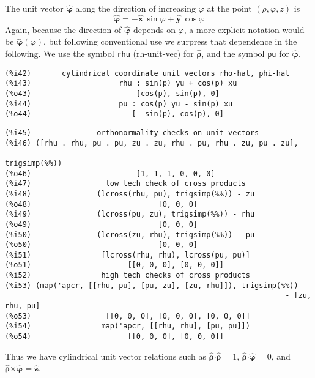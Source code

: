 \documentclass[12pt]{article}
\begin{document}
\smallskip
  
The unit vector $\boldsymbol{\hat{\varphi}}$  along the direction of increasing $\varphi$
  at the point $(\rho,\varphi,z)$ is
\begin{equation}  
  \boldsymbol{\hat{\varphi}} = -\mathbf{\hat{x}} \,\sin \varphi +   \mathbf{\hat{y}} \,\cos \varphi
\end{equation}  
Again, because the direction of $\boldsymbol{\hat{\varphi}}$ depends on $\varphi$,
  a more explicit notation would be $\boldsymbol{\hat{\varphi}}(\varphi)$, but following
  conventional use we surpress that dependence in the following.
We use the symbol \verb|rhu| (rh-unit-vec) for $\boldsymbol{\hat{\rho}}$, and the
  symbol \verb|pu| for $\boldsymbol{\hat{\varphi}}$.

\small
\begin{verbatim}
(%i42)       cylindrical coordinate unit vectors rho-hat, phi-hat  
(%i43)                    rhu : sin(p) yu + cos(p) xu
(%o43)                        [cos(p), sin(p), 0]
(%i44)                    pu : cos(p) yu - sin(p) xu
(%o44)                       [- sin(p), cos(p), 0]
\end{verbatim}
\newpage
\begin{verbatim}
(%i45)               orthonormality checks on unit vectors 
(%i46) ([rhu . rhu, pu . pu, zu . zu, rhu . pu, rhu . zu, pu . zu], 
                                                                  trigsimp(%%))
(%o46)                        [1, 1, 1, 0, 0, 0]
(%i47)                 low tech check of cross products 
(%i48)               (lcross(rhu, pu), trigsimp(%%)) - zu
(%o48)                             [0, 0, 0]
(%i49)               (lcross(pu, zu), trigsimp(%%)) - rhu
(%o49)                             [0, 0, 0]
(%i50)               (lcross(zu, rhu), trigsimp(%%)) - pu
(%o50)                             [0, 0, 0]
(%i51)                [lcross(rhu, rhu), lcross(pu, pu)]
(%o51)                      [[0, 0, 0], [0, 0, 0]]
(%i52)                high tech checks of cross products 
(%i53) (map('apcr, [[rhu, pu], [pu, zu], [zu, rhu]]), trigsimp(%%))
                                                                - [zu, rhu, pu]
(%o53)                 [[0, 0, 0], [0, 0, 0], [0, 0, 0]]
(%i54)                map('apcr, [[rhu, rhu], [pu, pu]])
(%o54)                      [[0, 0, 0], [0, 0, 0]]
\end{verbatim}
\normalsize
Thus we have cylindrical unit vector relations such as 
  $\boldsymbol{\hat{\rho}} \boldsymbol{\cdot} \boldsymbol{\hat{\rho}} = 1$,
  $\boldsymbol{\hat{\rho}} \boldsymbol{\cdot} \boldsymbol{\hat{\varphi}} = 0$,
  and $\boldsymbol{\hat{\rho}} \boldsymbol{\times} \boldsymbol{\hat{\varphi}} = \mathbf{\hat{z}}$.
\end{document}
